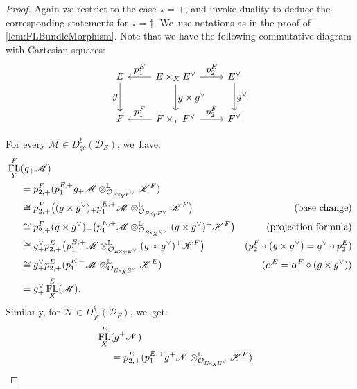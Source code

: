 \documentclass[11pt]{article}
\let\ts\textstyle
\DeclareMathOperator{\FL}{\textup{FL}}
\begin{document}
\begin{proof}
Again we restrict to the case
$\star=+$, and invoke duality to deduce the corresponding statements for $\star=\dag$. We~use notations as in the proof of \cref{lem:FLBundleMorphism}. Note that we have the following commutative diagram with Cartesian squares:\vspace*{-5pt}
\[
\begin{tikzcd}[row sep=large]
E \ar[swap]{d}{\ts g} & E \times_X E^\vee \ar{l}[swap]{\ts p_1^E} \ar{r}{\ts p_2^E} \ar{d}{\ts g \times g^\vee} & E^\vee \ar{d}{\ts g^\vee} \\
F & F \times_Y F^\vee \ar{l}[swap]{\ts p_1^F} \ar{r}{\ts p_2^F} & F^\vee
\end{tikzcd}
\]
\vspace*{-.5\baselineskip}\par
\noindent 
For every $\mathscr M \in D_{qc}^b(\mathscr D_E)$, we~have:\vspace*{-5pt}
\begin{align*}
\FL_Y^F&(g_+ \mathscr M) & \\
&= p_{2,+}^F (p_1^{F,+} g_+ \mathscr M \otimes^{\mathbb L}_{\O_{F\!\times_{\!Y}\!F^\vee}} \mathscr K^F) & \\
&\cong p_{2,+}^F \big((g \times g^\vee)_+ p_1^{E,+} \mathscr M \otimes^{\mathbb L}_{\O_{F\!\times_{\!Y}\!F^\vee}} \mathscr K^F\big) & \text{\small (base change)} \\
&\cong p_{2,+}^F (g \times g^\vee)_+ \big(p_1^{E,+} \mathscr M \otimes^{\mathbb L}_{\O_{E\!\times_{\!X}\!E^\vee}} (g \times g^\vee)^+\mathscr K^F\big) & \text{\small (projection formula)} \\
&\cong g^\vee_+ p_{2,+}^E \big(p_1^{E,+} \mathscr M \otimes^{\mathbb L}_{\O_{E\!\times_{\!X}\!E^\vee}} (g \times g^\vee)^+\mathscr K^F\big) & \text{\small ($p_2^F \circ (g \times g^\vee) = g^\vee \circ p_2^E$)} \\
&\cong g^\vee_+ p_{2,+}^E (p_1^{E,+} \mathscr M \otimes^{\mathbb L}_{\O_{E\!\times_{\!X}\!E^\vee}} \mathscr K^E) & \text{\small ($\alpha^E = \alpha^F \circ (g \times g^\vee)$)} \\
&= g_+^\vee \FL_X^E(\mathscr M).
\end{align*}
Similarly, for $\mathscr N \in D_{qc}^b(\mathscr D_F)$, we~get:\vspace*{-3pt}
\begin{align*}
\FL_X^E&(g^+ \mathscr N) & \\
&= p_{2,+}^E (p_1^{E,+} g^+ \mathscr N \otimes^{\mathbb L}_{\O_{E\!\times_{\!X}\!E^\vee}} \mathscr K^E) & \\

\end{align*}
\end{proof}
\end{document}
